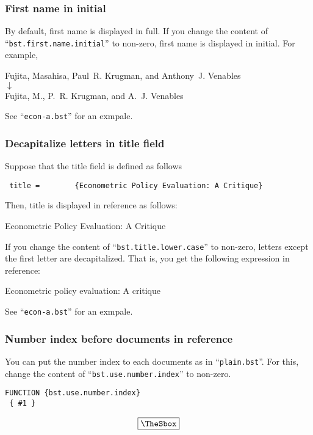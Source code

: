 \documentclass[10pt]{article}
\newenvironment{Frame}%
{\setlength{\fboxsep}{15pt}
\setlength{\mylength}{\linewidth}%
\addtolength{\mylength}{-2\fboxsep}%
\addtolength{\mylength}{-2\fboxrule}%
\Sbox
\minipage{\mylength}%
\setlength{\abovedisplayskip}{0pt}%
\setlength{\belowdisplayskip}{0pt}%
}%
{\endminipage\endSbox
\[\fbox{\TheSbox}\]}
\begin{document}
\subsubsection{First name in initial}

By default, first name is displayed in full.  If you change the content
of ``\texttt{bst.first.name.initial}'' to non-zero, first name is displayed
in initial.  For example,
\begin{center}
Fujita, Masahisa, Paul~R. Krugman, and Anthony~J. Venables \\
 $\downarrow$ \\
Fujita, M., P.~R. Krugman, and A.~J. Venables
\end{center}

See ``\texttt{econ-a.bst}'' for an exmpale.

\subsubsection{Decapitalize letters in title field}

Suppose that the title field is defined as follows
\begin{center}
  \verb| title =        {Econometric Policy Evaluation: A Critique}|
\end{center}

Then, title is displayed in reference as follows:
\begin{center}
 Econometric Policy Evaluation: A Critique
\end{center}

If you change the content of ``\texttt{bst.title.lower.case}'' to
non-zero, letters except the first letter are decapitalized.  That is,
you get the following expression in reference:
\begin{center}
 Econometric policy evaluation: A critique
\end{center}

See ``\texttt{econ-a.bst}'' for an exmpale.


\subsubsection{Number index before documents in reference}

You can put the number index to each documents as in
``\texttt{plain.bst}''.  For this, change the content of
``\texttt{bst.use.number.index}'' to non-zero.
\begin{Frame}
\begin{verbatim}
FUNCTION {bst.use.number.index}
 { #1 }
\end{verbatim}
\end{Frame}
\end{document}
